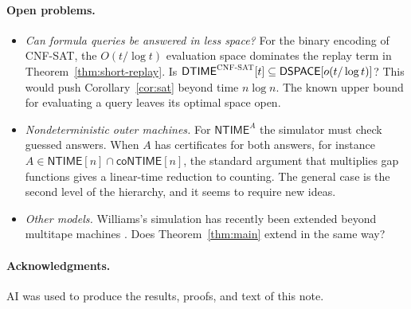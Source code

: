 \documentclass[11pt]{article}
\theoremstyle{remark}
\newcommand{\DTIME}{\mathsf{DTIME}}
\newcommand{\DSPACE}{\mathsf{DSPACE}}
\newcommand{\NTIME}{\mathsf{NTIME}}
\newcommand{\SAT}{\textup{\textsc{CNF-SAT}}}
\begin{document}
\paragraph{Open problems.}
\begin{itemize}
\item \emph{Can formula queries be answered in less space?} For the
binary encoding of \SAT{}, the $O(t/\log t)$ evaluation space
dominates the replay term in Theorem~\ref{thm:short-replay}. Is
$\DTIME^{\SAT}[t]\subseteq\DSPACE[o(t/\log t)]$? This would push
Corollary~\ref{cor:sat} beyond time $n\log n$. The known upper bound
for evaluating a query leaves its optimal space open.
\item \emph{Nondeterministic outer machines.} For $\NTIME^A$ the
simulator must check guessed answers. When $A$ has certificates for both
answers, for instance $A\in\NTIME[n]\cap\mathsf{coNTIME}[n]$, the standard
argument that multiplies gap functions gives a linear-time reduction to
counting. The general case is the second level of the hierarchy, and it
seems to require new ideas.
\item \emph{Other models.} Williams's simulation has recently been
extended beyond multitape machines \cite{SW26}. Does
Theorem~\ref{thm:main} extend in the same way?
\end{itemize}

\paragraph{Acknowledgments.}
AI was used to produce the results, proofs, and text of this note.
\end{document}
